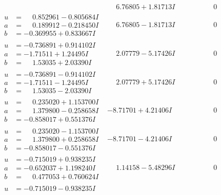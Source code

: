 \documentclass[1p]{elsarticle_modified}
\theoremstyle{definition}
\begin{document}
$$\begin{array}{c|c|c}
 & \phantom{-}6.76805 + 1.81713 I & \phantom{-0.000000 } 0 \\ \hline\begin{aligned}
u &= \phantom{-}0.852961 - 0.805684 I \\
a &= \phantom{-}0.189912 - 0.218450 I \\
b &= -0.369955 + 0.833667 I\end{aligned}
 & \phantom{-}6.76805 - 1.81713 I & \phantom{-0.000000 } 0 \\ \hline\begin{aligned}
u &= -0.736891 + 0.914102 I \\
a &= -1.71511 + 1.24495 I \\
b &= \phantom{-}1.53035 + 2.03390 I\end{aligned}
 & \phantom{-}2.07779 - 5.17426 I & \phantom{-0.000000 } 0 \\ \hline\begin{aligned}
u &= -0.736891 - 0.914102 I \\
a &= -1.71511 - 1.24495 I \\
b &= \phantom{-}1.53035 - 2.03390 I\end{aligned}
 & \phantom{-}2.07779 + 5.17426 I & \phantom{-0.000000 } 0 \\ \hline\begin{aligned}
u &= \phantom{-}0.235020 + 1.153700 I \\
a &= \phantom{-}1.379800 - 0.258658 I \\
b &= -0.858017 + 0.551376 I\end{aligned}
 & -8.71701 + 4.21406 I & \phantom{-0.000000 } 0 \\ \hline\begin{aligned}
u &= \phantom{-}0.235020 - 1.153700 I \\
a &= \phantom{-}1.379800 + 0.258658 I \\
b &= -0.858017 - 0.551376 I\end{aligned}
 & -8.71701 - 4.21406 I & \phantom{-0.000000 } 0 \\ \hline\begin{aligned}
u &= -0.715019 + 0.938235 I \\
a &= -0.652037 + 1.198240 I \\
b &= \phantom{-}0.477053 + 0.760624 I\end{aligned}
 & \phantom{-}1.14158 - 5.48296 I & \phantom{-0.000000 } 0 \\ \hline\begin{aligned}
u &= -0.715019 - 0.938235 I \\

\end{aligned}
\end{array}$$
\end{document}
